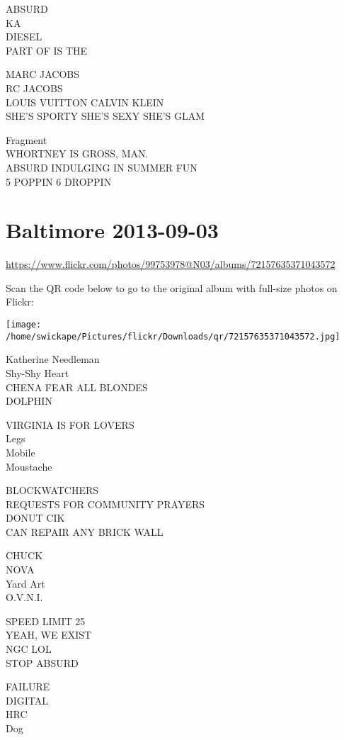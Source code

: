 \documentclass[10pt,letterpaper]{article}
\begin{document}
ABSURD\\
KA\\
DIESEL\\
PART OF IS THE

MARC JACOBS\\
RC JACOBS\\
LOUIS VUITTON CALVIN KLEIN\\
SHE'S SPORTY SHE'S SEXY SHE'S GLAM

Fragment\\
WHORTNEY IS GROSS, MAN.\\
ABSURD INDULGING IN SUMMER FUN\\
5 POPPIN 6 DROPPIN


\section*{Baltimore 2013-09-03}

\url{https://www.flickr.com/photos/99753978@N03/albums/72157635371043572}

Scan the QR code below to go to the original album with full-size photos on Flickr:

\texttt{[image: /home/swickape/Pictures/flickr/Downloads/qr/72157635371043572.jpg]}


Katherine Needleman\\
Shy{-}Shy Heart\\
CHENA FEAR ALL BLONDES\\
DOLPHIN

VIRGINIA IS FOR LOVERS\\
Legs\\
Mobile\\
Moustache

BLOCKWATCHERS\\
REQUESTS FOR COMMUNITY PRAYERS\\
DONUT CIK\\
CAN REPAIR ANY BRICK WALL

CHUCK\\
NOVA\\
Yard Art\\
O.V.N.I.

SPEED LIMIT 25\\
YEAH, WE EXIST\\
NGC LOL\\
STOP ABSURD

FAILURE\\
DIGITAL\\
HRC\\
Dog
\end{document}
